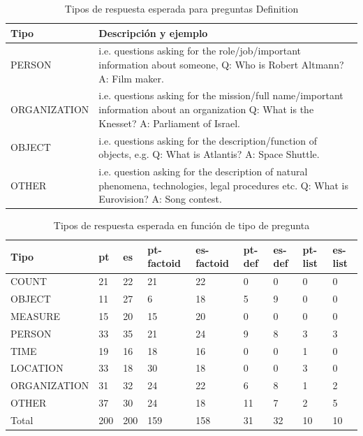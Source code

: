 \begin{center}
\begin{table}
\begin{tabular}{| l | p{12cm}|}
\hline
Tipo & Descripción y ejemplo \\ \hline
PERSON & i.e. questions asking for the role/job/important information about someone, \newline
 Q: Who is Robert Altmann? \newline
 A: Film maker. \\ \hline
ORGANIZATION & i.e. questions asking for the mission/full name/important information about an organization \newline
 Q: What is the Knesset? \newline
 A: Parliament of Israel. \\ \hline
OBJECT & i.e. questions asking for the description/function of objects, e.g. \newline
Q: What is Atlantis? \newline
A: Space Shuttle. \\ \hline
OTHER & i.e. question asking for the description of natural phenomena, technologies, legal procedures etc. \newline
Q: What is Eurovision? \newline
A: Song contest. \\ \hline
\end{tabular}
\caption{Tipos de respuesta esperada para preguntas Definition}
\label{table:definition-questions}
\end{table}
\end{center}

\begin{center}
\begin{table}
\begin{tabular}{| l | l | l | l | l | l |l |l|l|}
\hline
Tipo & pt & es & pt-factoid & es-factoid & pt-def & es-def & pt-list & es-list \\ \hline
COUNT & 21 & 22 & 21 & 22 & 0 & 0 & 0  & 0\\ \hline
OBJECT & 11 & 27 & 6  & 18 & 5 & 9 & 0  & 0\\ \hline
MEASURE & 15 & 20 & 15 & 20 & 0 & 0 & 0  & 0\\ \hline
PERSON & 33  & 35 & 21 & 24 & 9 & 8 & 3 & 3\\ \hline
TIME & 19 & 16 & 18 & 16 & 0 & 0 & 1 & 0\\ \hline
LOCATION & 33 & 18  & 30 & 18 & 0 & 0 & 3 & 0 \\ \hline
ORGANIZATION & 31 & 32 & 24 & 22 & 6 & 8 & 1 & 2\\ \hline
OTHER & 37 & 30 & 24 & 18 & 11 & 7 & 2 & 5 \\ \hline
Total & 200 & 200 & 159 & 158 & 31 & 32  & 10 & 10\\ \hline
\end{tabular}
\caption{Tipos de respuesta esperada en función de tipo de pregunta}
\label{table:tipo-general}
\end{table}
\end{center}


